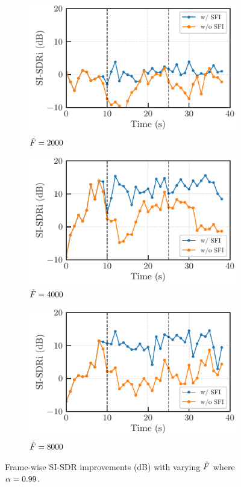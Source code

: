 \documentclass{article}
\begin{document}
\begin{figure}[h]
  \centering
  \begin{subfigure}[t]{.3\textwidth}
    \includegraphics[scale=\myscale]{figures/plots/online/Gauss_2000_99.pdf}
    \caption{$\tilde{F} = 2000$}
  \end{subfigure}
  \begin{subfigure}[t]{.3\textwidth}
    \includegraphics[scale=\myscale]{figures/plots/online/Gauss_4000_99.pdf}
    \caption{$\tilde{F} = 4000$}
  \end{subfigure}
  \begin{subfigure}[t]{.3\textwidth}
    \includegraphics[scale=\myscale]{figures/plots/online/Gauss_8000_99.pdf}
    \caption{$\tilde{F} = 8000$}
  \end{subfigure}
  \caption{Frame-wise SI-SDR improvements (dB) with varying $\tilde{F}$ where $\alpha = 0.99$.}
  \label{fig:online:99}
\end{figure}
\end{document}
